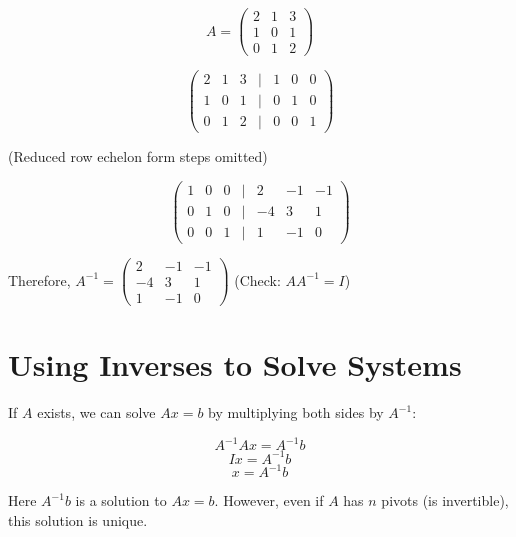 \documentclass[12pt,a4paper]{article}
\begin{document}
\[A = \begin{pmatrix} 2 & 1 & 3 \\ 1 & 0 & 1 \\ 0 & 1 & 2 \end{pmatrix}\]

\[
\begin{pmatrix}
2 & 1 & 3 & | & 1 & 0 & 0 \\
1 & 0 & 1 & | & 0 & 1 & 0 \\
0 & 1 & 2 & | & 0 & 0 & 1
\end{pmatrix}
\]

(Reduced row echelon form steps omitted)

\[
\begin{pmatrix}
1 & 0 & 0 & | & 2 & -1 & -1 \\
0 & 1 & 0 & | & -4 & 3 & 1 \\
0 & 0 & 1 & | & 1 & -1 & 0
\end{pmatrix}
\]

Therefore, $A^{-1} = \begin{pmatrix} 2 & -1 & -1 \\ -4 & 3 & 1 \\ 1 & -1 & 0 \end{pmatrix}$ (Check: $AA^{-1} = I$)

\section{Using Inverses to Solve Systems}

If $A$ exists, we can solve $Ax = b$ by multiplying both sides by $A^{-1}$:

\[A^{-1}Ax = A^{-1}b\]
\[Ix = A^{-1}b\]
\[x = A^{-1}b\]

Here $A^{-1}b$ is a solution to $Ax = b$. However, even if $A$ has $n$ pivots (is invertible), this solution is unique.
\end{document}
